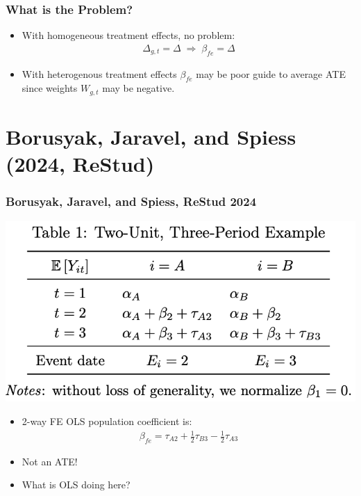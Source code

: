 \documentclass[english,xcolor=svgnames]{beamer}
\begin{document}
\begin{frame}
\frametitle[alignment=center]{What is the Problem?}
\begin{itemize}
	\item With homogeneous treatment effects, no problem:
	\begin{align*}
		 \Delta_{g,t}=\Delta \;\Rightarrow\; \beta_{fe} = \Delta
	\end{align*}
	\item With heterogenous treatment effects $\beta_{fe}$ may be poor guide to average ATE since weights $W_{g,t}$ may be negative.
\end{itemize}
\end{frame}

\section{Borusyak, Jaravel, and Spiess (2024, ReStud)}

\begin{frame}
\frametitle[alignment=center]{Borusyak, Jaravel, and Spiess, ReStud 2024}
\begin{center}
	\includegraphics[scale=0.5]{figures/BJSTAB1.png}
\end{center}
\begin{itemize}
	\item 2-way FE OLS population coefficient is:
	\begin{align*}
		\beta_{fe} = \tau_{A2} + \frac{1}{2}\tau_{B3} - \frac{1}{2}\tau_{A3}
	\end{align*}
	\item Not an ATE!
	\item What is OLS doing here?
\end{itemize}
\end{frame}
\end{document}
